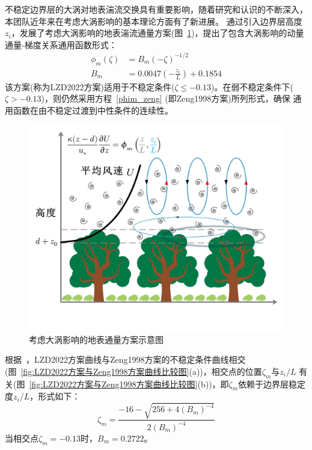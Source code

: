 不稳定边界层的大涡对地表湍流交换具有重要影响，随着研究和认识的不断深入，本团队近年来在考虑大涡影响的基本理论方面有了新进展。\citet{liu2019further,liu2022surface}
通过引入边界层高度$z_i$，发展了考虑大涡影响的地表湍流通量方案(图~\ref{fig:LZD2022方案概念图})，提出了包含大涡影响的动量通量-梯度关系通用函数形式：
\begin{equation}
  \begin{aligned}
     \phi_{m}(\zeta) &= B_{m} (-\zeta)^{-1/2} \\[1ex]
     B_{m} &= 0.0047(-\frac{z_{i}}{L})+0.1854
  \end{aligned}
\end{equation}
该方案(称为LZD2022方案)适用于不稳定条件($\zeta \leqslant -0.13$)。在弱不稳定条件下($\zeta > -0.13$)，则仍然采用方程~\eqref{phim_zeng} (即Zeng1998方案)所列形式，确保
通用函数在由不稳定过渡到中性条件的连续性。
{
\begin{figure}[htbp]
\centering
\includegraphics[scale=0.7]{Figures/地表湍流交换过程/LZD2022方案概念图.png}
\caption{考虑大涡影响的地表通量方案示意图}
\label{fig:LZD2022方案概念图}
\end{figure}
}

根据~\citet{liu2023referenceheight}，LZD2022方案曲线与Zeng1998方案的不稳定条件曲线相交(图~\ref{fig:LZD2022方案与Zeng1998方案曲线比较图}(a))，相交点的位置$\zeta_{m}$与${z_{i}}/{L}$
有关(图~\ref{fig:LZD2022方案与Zeng1998方案曲线比较图}(b))，即$\zeta_{m}$依赖于边界层稳定度${z_{i}}/{L}$，形式如下：
\begin{equation}
     \zeta_{m}=\frac{-16-\sqrt{256+4 \left(B_{m}\right)^{-4}}}{2 \left(B_{m}\right)^{-4}}
\end{equation}
当相交点$\zeta_{m}=-0.13$时，$B_{m}=0.2722$。

